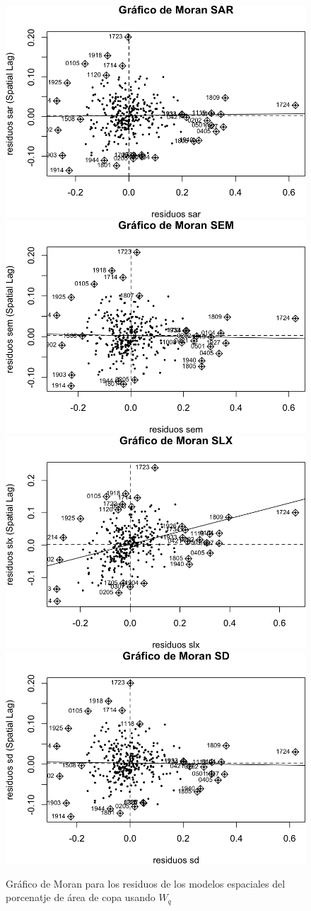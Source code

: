 \documentclass[12pt,]{book}
\begin{document}
\begin{figure}
\includegraphics[width=0.49\linewidth]{tesis-unigis_files/figure-latex/moranplot-resmodel-all-copaap-wq-1} \includegraphics[width=0.49\linewidth]{tesis-unigis_files/figure-latex/moranplot-resmodel-all-copaap-wq-2} \includegraphics[width=0.49\linewidth]{tesis-unigis_files/figure-latex/moranplot-resmodel-all-copaap-wq-3} \includegraphics[width=0.49\linewidth]{tesis-unigis_files/figure-latex/moranplot-resmodel-all-copaap-wq-4} \caption{Gráfico de Moran para los residuos de los modelos espaciales del porcenatje de área de copa usando $W_{q}$}\label{fig:moranplot-resmodel-all-copaap-wq}
\end{figure}
\end{document}
